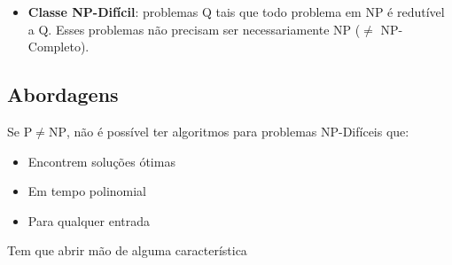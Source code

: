 \begin{itemize}
    \item \textbf{Classe NP-Difícil}: problemas Q tais que todo problema em NP é redutível a Q. Esses problemas não precisam ser necessariamente NP ($\neq$ NP-Completo).
\end{itemize}

\subsection{Abordagens}

Se $\mathrm{P} \neq \mathrm{NP}$, não é possível ter algoritmos para problemas NP-Difíceis que:
\begin{itemize}
    \item Encontrem soluções ótimas
    \item Em tempo polinomial
    \item Para qualquer entrada
\end{itemize}

Tem que abrir mão de alguma característica

